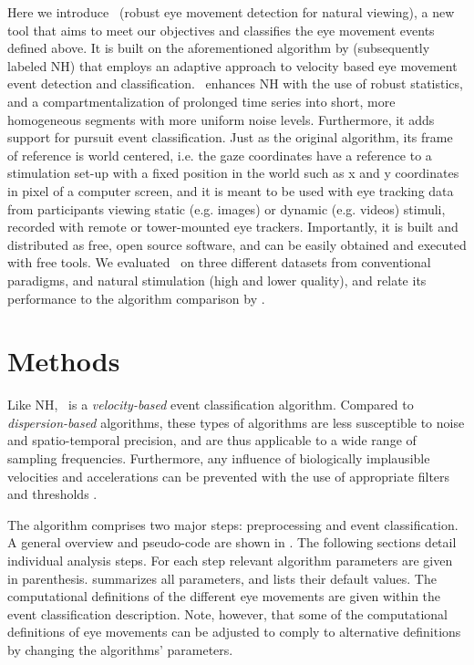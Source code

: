 Here we introduce \remodnav\ (robust eye movement detection for natural
viewing), a new tool that aims to meet our objectives and classifies the
eye movement events defined above. It is built on the
aforementioned algorithm by \citet{Nystrom2010AnData} (subsequently labeled NH)
that employs an adaptive approach to velocity based eye movement event
detection and classification. \remodnav\ enhances NH with the use of robust
statistics, and a compartmentalization of prolonged time series into short,
more homogeneous segments with more uniform noise levels.
Furthermore, it adds support for pursuit event classification.
Just as the original algorithm, its frame of reference is world centered,
i.e. the gaze coordinates have a reference to a stimulation set-up with a fixed
position in the world such as x and y coordinates in pixel of a computer screen,
and it is meant to be used with eye tracking data from participants viewing
static (e.g. images) or dynamic (e.g. videos) stimuli, recorded with remote or
tower-mounted eye trackers.
Importantly, it is built and distributed as free, open source software,
and can be easily obtained and executed with free tools.
We evaluated \remodnav\ on three different
datasets from conventional paradigms, and natural stimulation (high and lower
quality), and relate its performance to the algorithm comparison by
\cite{Andersson2017}.


\section*{Methods}\label{methods}



Like NH, \remodnav\ is a \textit{velocity-based} event classification algorithm.
Compared to \textit{dispersion-based} algorithms, these types of algorithms are
less susceptible to noise and spatio-temporal precision, and are thus applicable to
a wide range of sampling frequencies. Furthermore, any influence of
biologically implausible velocities and accelerations can be prevented with the
use of appropriate filters and thresholds \citep{holmqvist2011eye}.

The algorithm comprises two major steps: preprocessing and event classification.  A
general overview and pseudo-code are shown in .  The following
sections detail individual analysis steps. For each step relevant algorithm
parameters are given in parenthesis.  summarizes all
parameters, and lists their default values.
The computational definitions of the different eye movements
\citep{hessels2018eye} are given within the event classification description.
Note, however, that some of the computational definitions of eye movements can be
adjusted to comply to alternative definitions by changing the algorithms'
parameters.


